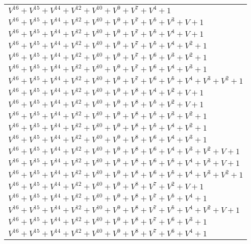 \documentclass[12pt]{article}
\begin{document}
\begin{adjustwidth}{-4cm}{}
\begin{center}
\begin{longtable}{|l|}
$V^{16}  +V^{15}  +V^{14}  +V^{12}  +V^{10}  +V^{9}  +V^{7}  +V^{4}  + 1$ \\
$V^{16}  +V^{15}  +V^{14}  +V^{12}  +V^{10}  +V^{9}  +V^{7}  +V^{5}  +V^{3}  + V + 1$ \\
$V^{16}  +V^{15}  +V^{14}  +V^{12}  +V^{10}  +V^{9}  +V^{7}  +V^{5}  +V^{4}  + V + 1$ \\
$V^{16}  +V^{15}  +V^{14}  +V^{12}  +V^{10}  +V^{9}  +V^{7}  +V^{5}  +V^{4}  +V^{2}  + 1$ \\
$V^{16}  +V^{15}  +V^{14}  +V^{12}  +V^{10}  +V^{9}  +V^{7}  +V^{6}  +V^{3}  +V^{2}  + 1$ \\
$V^{16}  +V^{15}  +V^{14}  +V^{12}  +V^{10}  +V^{9}  +V^{7}  +V^{6}  +V^{4}  +V^{3}  + 1$ \\
$V^{16}  +V^{15}  +V^{14}  +V^{12}  +V^{10}  +V^{9}  +V^{7}  +V^{6}  +V^{5}  +V^{4}  +V^{3}  +V^{2}  + 1$ \\
$V^{16}  +V^{15}  +V^{14}  +V^{12}  +V^{10}  +V^{9}  +V^{8}  +V^{4}  +V^{2}  + V + 1$ \\
$V^{16}  +V^{15}  +V^{14}  +V^{12}  +V^{10}  +V^{9}  +V^{8}  +V^{5}  +V^{2}  + V + 1$ \\
$V^{16}  +V^{15}  +V^{14}  +V^{12}  +V^{10}  +V^{9}  +V^{8}  +V^{5}  +V^{3}  +V^{2}  + 1$ \\
$V^{16}  +V^{15}  +V^{14}  +V^{12}  +V^{10}  +V^{9}  +V^{8}  +V^{5}  +V^{4}  +V^{2}  + 1$ \\
$V^{16}  +V^{15}  +V^{14}  +V^{12}  +V^{10}  +V^{9}  +V^{8}  +V^{6}  +V^{4}  +V^{3}  + 1$ \\
$V^{16}  +V^{15}  +V^{14}  +V^{12}  +V^{10}  +V^{9}  +V^{8}  +V^{6}  +V^{4}  +V^{3}  +V^{2}  + V + 1$ \\
$V^{16}  +V^{15}  +V^{14}  +V^{12}  +V^{10}  +V^{9}  +V^{8}  +V^{6}  +V^{5}  +V^{4}  +V^{3}  + V + 1$ \\
$V^{16}  +V^{15}  +V^{14}  +V^{12}  +V^{10}  +V^{9}  +V^{8}  +V^{6}  +V^{5}  +V^{4}  +V^{3}  +V^{2}  + 1$ \\
$V^{16}  +V^{15}  +V^{14}  +V^{12}  +V^{10}  +V^{9}  +V^{8}  +V^{7}  +V^{2}  + V + 1$ \\
$V^{16}  +V^{15}  +V^{14}  +V^{12}  +V^{10}  +V^{9}  +V^{8}  +V^{7}  +V^{5}  +V^{4}  + 1$ \\
$V^{16}  +V^{15}  +V^{14}  +V^{12}  +V^{10}  +V^{9}  +V^{8}  +V^{7}  +V^{5}  +V^{4}  +V^{2}  + V + 1$ \\
$V^{16}  +V^{15}  +V^{14}  +V^{12}  +V^{10}  +V^{9}  +V^{8}  +V^{7}  +V^{6}  +V^{3}  + 1$ \\
$V^{16}  +V^{15}  +V^{14}  +V^{12}  +V^{10}  +V^{9}  +V^{8}  +V^{7}  +V^{6}  +V^{4}  + 1$ \\

\end{longtable}
\end{center}
\end{adjustwidth}
\end{document}
